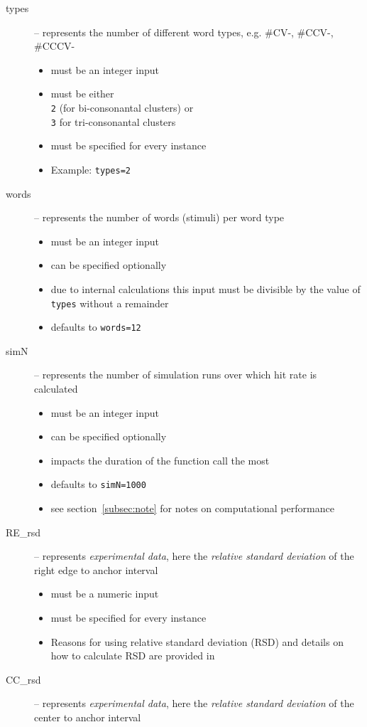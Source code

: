 \documentclass[
draft=false,
toc=graduated,
listof=totoc,
headsepline=true,
]%
{scrartcl}
\begin{document}
\begin{description}
\item[types] -- represents the number of different word types, e.g. \#CV-, \#CCV-, \#CCCV-
\begin{itemize}
\item must be an integer input
\item must be either\\%
\texttt{2} (for bi-consonantal clusters) or\\%
\texttt{3} for tri-consonantal clusters
\item must be specified for every instance
\item Example: \texttt{types=2}
\end{itemize}
\item[words] -- represents the number of words (stimuli) per word type
\begin{itemize}
\item must be an integer input
\item can be specified optionally
\item due to internal calculations this input must be divisible by the value of \texttt{types} without a remainder
\item defaults to \texttt{words=12}
\end{itemize}
\item[simN] -- represents the number of simulation runs over which hit rate is calculated
\begin{itemize}
\item must be an integer input
\item can be specified optionally
\item impacts the duration of the function call the most
\item defaults to \texttt{simN=1000}
\item see section~\ref{subsec:note} for notes on computational performance
\end{itemize}
\item[RE\_rsd] -- represents \emph{experimental data}, here the \emph{relative standard deviation} of the right edge to anchor interval
\begin{itemize}
\item must be a numeric input
\item must be specified for every instance
\item Reasons for using relative standard deviation (RSD) and details on how to calculate
RSD are provided in~\textcite[][section 3:3]{Shaw2009}
\end{itemize}
\item[CC\_rsd] -- represents \emph{experimental data}, here the \emph{relative standard deviation} of the center to anchor interval

\end{description}
\end{document}
